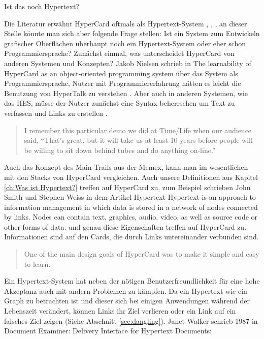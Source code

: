 \begin{section}{Ist das noch Hypertext?}
\label{sec:nochHypertext}

Die Literatur erwähnt HyperCard oftmals als Hypertext-System \cite{Nielsen1995}, \cite{Dam1988}, \cite{Smith1988}, an dieser Stelle könnte man sich aber folgende Frage stellen: Ist ein System zum Entwickeln grafischer Oberflächen überhaupt noch ein Hypertext-System oder eher schon Programmiersprache? 
Zunächst einmal, was unterscheidet HyperCard von anderen Systemen und Konzepten? Jakob Nielsen schrieb in The learnability of HyperCard as an object-oriented programming system über das System als Programmiersprache, Nutzer mit Programmiererfahrung hätten es leicht die Benutzung von HyperTalk zu verstehen \cite{Nielsen1991}. Aber auch in anderen Systemen, wie das HES, müsse der Nutzer zunächst eine Syntax beherrschen um Text zu verfassen und Links zu erstellen \cite{Dam1969}.

\begin{quote}
\glqq I remember this particular demo we did at Time/Life when our audience said, “That’s great, but it will take us at least 10 years before people will be willing to sit down behind tubes and do anything on-line.”\grqq{ }\cite{Dam1988}
\end{quote}

Auch das Konzept des Main Trails aus der Memex, kann man im wesentlichen mit den Stacks von HyperCard vergleichen. Auch unsere Definitionen aus Kapitel \ref{ch:Was ist Hypertext?} treffen auf HyperCard zu, zum Beispiel schrieben John Smith und Stephen Weiss in dem Artikel Hypertext \glqq [...] Hypertext is an approach to information management in which data is stored in a network of nodes connected by links. Nodes can contain text, graphics, audio, video, as well as source code or other forms of data.\grqq{ }\cite{Smith1988} und genau diese Eigenschaften treffen auf HyperCard zu. Informationen sind auf den Cards, die durch Links untereinander verbunden sind.

\begin{quote}
\glqq One of the main design goals of HyperCard was to make it simple and easy to learn.\grqq \cite{Nielsen1991}
\end{quote}

Ein Hypertext-System hat neben der nötigen Benutzerfreundlichkeit für eine hohe Akzeptanz auch mit andern Problemen zu kämpfen. Da ein Hypertext wie ein Graph zu betrachten ist und dieser sich bei einigen Anwendungen während der Lebenszeit verändert, können Links ihr Ziel verlieren oder ein Link auf ein falsches Ziel zeigen (Siehe Abschnitt \ref{sec:dangling}). Janet Walker schrieb 1987 in \glqq Document Examiner: Delivery Interface for Hypertext Documents\grqq: 


\end{section}
